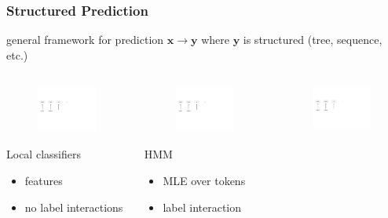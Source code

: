 \documentclass[10pt]{beamer}
\begin{document}

\begin{frame}[t]
\frametitle{Structured Prediction}

general framework for prediction $\mathbf{x} \rightarrow \mathbf{y}$ where $\mathbf{y}$ is structured (tree, sequence, etc.)


\begin{columns}[t]
	
	\begin{column}{.3\textwidth}

	\begin{figure}[t]
		\centering
			\includegraphics[height=1.6cm, page=1]{figures/local.pdf}
	\end{figure}
	
	Local classifiers
	\small
	\vspace{0.35cm}
	\begin{itemize}
		\item features 
		\item no label interactions
	\end{itemize}
\end{column}

\begin{column}{.3\textwidth}


	\begin{figure}[t]
		\centering
			\includegraphics[height=1.6cm, page=2]{figures/local.pdf}
	\end{figure}

	HMM
	
	\small
	\begin{itemize}
		\item MLE over tokens 
		\item label interaction
	\end{itemize}
\end{column}


\begin{column}{.3\textwidth}
	\begin{figure}[t]
		\centering
			\includegraphics[height=1.56cm, page=3]{figures/local.pdf}
	\end{figure}


\end{column}
\end{columns}
\end{frame}
\end{document}
